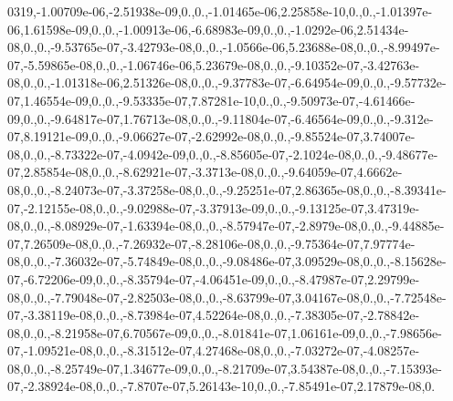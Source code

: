 {0319,-\/1.\-00709e-\/06,-\/2.\-51938e-\/09,0.,0.,-\/1.\-01465e-\/06,2.\-25858e-\/10,0.,0.,-\/1.\-01397e-\/06,1.\-61598e-\/09,0.,0.,-\/1.\-00913e-\/06,-\/6.\-68983e-\/09,0.,0.,-\/1.\-0292e-\/06,2.\-51434e-\/08,0.,0.,-\/9.\-53765e-\/07,-\/3.\-42793e-\/08,0.,0.,-\/1.\-0566e-\/06,5.\-23688e-\/08,0.,0.,-\/8.\-99497e-\/07,-\/5.\-59865e-\/08,0.,0.,-\/1.\-06746e-\/06,5.\-23679e-\/08,0.,0.,-\/9.\-10352e-\/07,-\/3.\-42763e-\/08,0.,0.,-\/1.\-01318e-\/06,2.\-51326e-\/08,0.,0.,-\/9.\-37783e-\/07,-\/6.\-64954e-\/09,0.,0.,-\/9.\-57732e-\/07,1.\-46554e-\/09,0.,0.,-\/9.\-53335e-\/07,7.\-87281e-\/10,0.,0.,-\/9.\-50973e-\/07,-\/4.\-61466e-\/09,0.,0.,-\/9.\-64817e-\/07,1.\-76713e-\/08,0.,0.,-\/9.\-11804e-\/07,-\/6.\-46564e-\/09,0.,0.,-\/9.\-312e-\/07,8.\-19121e-\/09,0.,0.,-\/9.\-06627e-\/07,-\/2.\-62992e-\/08,0.,0.,-\/9.\-85524e-\/07,3.\-74007e-\/08,0.,0.,-\/8.\-73322e-\/07,-\/4.\-0942e-\/09,0.,0.,-\/8.\-85605e-\/07,-\/2.\-1024e-\/08,0.,0.,-\/9.\-48677e-\/07,2.\-85854e-\/08,0.,0.,-\/8.\-62921e-\/07,-\/3.\-3713e-\/08,0.,0.,-\/9.\-64059e-\/07,4.\-6662e-\/08,0.,0.,-\/8.\-24073e-\/07,-\/3.\-37258e-\/08,0.,0.,-\/9.\-25251e-\/07,2.\-86365e-\/08,0.,0.,-\/8.\-39341e-\/07,-\/2.\-12155e-\/08,0.,0.,-\/9.\-02988e-\/07,-\/3.\-37913e-\/09,0.,0.,-\/9.\-13125e-\/07,3.\-47319e-\/08,0.,0.,-\/8.\-08929e-\/07,-\/1.\-63394e-\/08,0.,0.,-\/8.\-57947e-\/07,-\/2.\-8979e-\/08,0.,0.,-\/9.\-44885e-\/07,7.\-26509e-\/08,0.,0.,-\/7.\-26932e-\/07,-\/8.\-28106e-\/08,0.,0.,-\/9.\-75364e-\/07,7.\-97774e-\/08,0.,0.,-\/7.\-36032e-\/07,-\/5.\-74849e-\/08,0.,0.,-\/9.\-08486e-\/07,3.\-09529e-\/08,0.,0.,-\/8.\-15628e-\/07,-\/6.\-72206e-\/09,0.,0.,-\/8.\-35794e-\/07,-\/4.\-06451e-\/09,0.,0.,-\/8.\-47987e-\/07,2.\-29799e-\/08,0.,0.,-\/7.\-79048e-\/07,-\/2.\-82503e-\/08,0.,0.,-\/8.\-63799e-\/07,3.\-04167e-\/08,0.,0.,-\/7.\-72548e-\/07,-\/3.\-38119e-\/08,0.,0.,-\/8.\-73984e-\/07,4.\-52264e-\/08,0.,0.,-\/7.\-38305e-\/07,-\/2.\-78842e-\/08,0.,0.,-\/8.\-21958e-\/07,6.\-70567e-\/09,0.,0.,-\/8.\-01841e-\/07,1.\-06161e-\/09,0.,0.,-\/7.\-98656e-\/07,-\/1.\-09521e-\/08,0.,0.,-\/8.\-31512e-\/07,4.\-27468e-\/08,0.,0.,-\/7.\-03272e-\/07,-\/4.\-08257e-\/08,0.,0.,-\/8.\-25749e-\/07,1.\-34677e-\/09,0.,0.,-\/8.\-21709e-\/07,3.\-54387e-\/08,0.,0.,-\/7.\-15393e-\/07,-\/2.\-38924e-\/08,0.,0.,-\/7.\-8707e-\/07,5.\-26143e-\/10,0.,0.,-\/7.\-85491e-\/07,2.\-17879e-\/08,0.}
